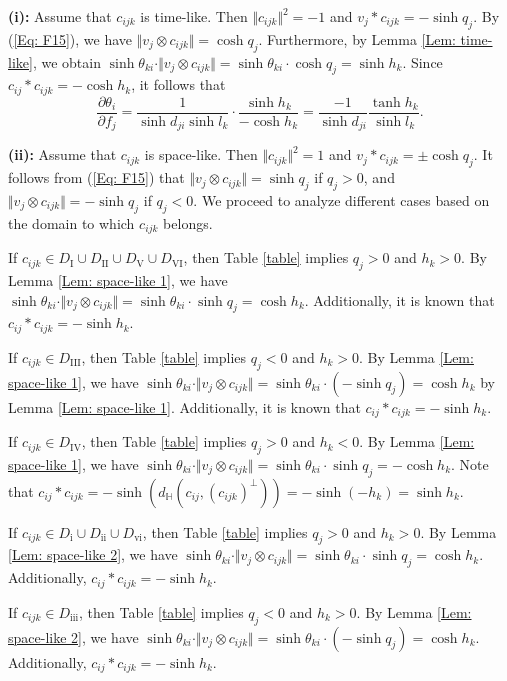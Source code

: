 \documentclass[12pt]{amsart}
\theoremstyle{definition}
\begin{document}
\noindent\textbf{(i):}
Assume that $c_{ijk}$ is time-like.
Then $\Vert c_{ijk}\Vert ^2=-1$ and $v_j*c_{ijk}=-\sinh q_j$.
By (\ref{Eq: F15}), we have
$\Vert v_j\otimes c_{ijk}\Vert =\cosh q_j$.
Furthermore, by Lemma \ref{Lem: time-like}, we obtain
$\sinh \theta_{ki}\cdot \Vert v_j\otimes c_{ijk}\Vert =\sinh \theta_{ki}\cdot\cosh q_j=\sinh h_k$.
Since $c_{ij}\ast c_{ijk}=-\cosh h_k$,
it follows that
\begin{equation*}
\frac{\partial \theta_i}{\partial f_j}
=\frac{1}{\sinh d_{ji}\sinh l_k}\cdot\frac{\sinh h_k}{-\cosh h_k}
=\frac{-1}{\sinh d_{ji}}\frac{\tanh h_k}{\sinh l_k}.
\end{equation*}

\noindent\textbf{(ii):}
Assume that $c_{ijk}$ is space-like.
Then $\Vert c_{ijk}\Vert ^2=1$ and $v_j*c_{ijk}=\pm\cosh q_j$.
It follows from (\ref{Eq: F15}) that
$\Vert v_j\otimes c_{ijk}\Vert =\sinh q_j$ if $q_j>0$, and $\Vert v_j\otimes c_{ijk}\Vert =-\sinh q_j$ if $q_j<0$.
We proceed to analyze different cases based on the domain to which $c_{ijk}$ belongs.

If $c_{ijk}\in D_{\mathrm{I}}\cup D_{\mathrm{II}}\cup D_{\mathrm{V}}\cup D_{\mathrm{VI}}$, then Table \ref{table} implies $q_j>0$ and $h_k>0$.
By Lemma \ref{Lem: space-like 1}, we have $\sinh \theta_{ki}\cdot \Vert v_j\otimes c_{ijk}\Vert =\sinh \theta_{ki}\cdot\sinh q_j=\cosh h_k$.
Additionally, it is known that $c_{ij}\ast c_{ijk}=-\sinh h_k$.

If $c_{ijk}\in D_{\mathrm{III}}$, then Table \ref{table} implies $q_j<0$ and $h_k>0$.
By Lemma \ref{Lem: space-like 1}, we have $\sinh \theta_{ki}\cdot \Vert v_j\otimes c_{ijk}\Vert =\sinh \theta_{ki}\cdot(-\sinh q_j)=\cosh h_k$ by Lemma \ref{Lem: space-like 1}.
Additionally, it is known that $c_{ij}\ast c_{ijk}=-\sinh h_k$.

If $c_{ijk}\in D_{\mathrm{IV}}$, then Table \ref{table} implies $q_j>0$ and $h_k<0$.
By Lemma \ref{Lem: space-like 1}, we have $\sinh \theta_{ki}\cdot \Vert v_j\otimes c_{ijk}\Vert =\sinh \theta_{ki}\cdot\sinh q_j=-\cosh h_k$. 
Note that $c_{ij}\ast c_{ijk}=-\sinh(d_\mathbb{H}(c_{ij},(c_{ijk})^\bot))=-\sinh (-h_k)=\sinh h_k$.

If $c_{ijk}\in D_{\mathrm{i}}\cup D_{\mathrm{ii}}\cup D_{\mathrm{vi}}$, then Table \ref{table} implies $q_j>0$ and $h_k>0$.
By Lemma \ref{Lem: space-like 2}, we have $\sinh \theta_{ki}\cdot \Vert v_j\otimes c_{ijk}\Vert =\sinh \theta_{ki}\cdot\sinh q_j=\cosh h_k$.
Additionally, $c_{ij}\ast c_{ijk}=-\sinh h_k$.

If $c_{ijk}\in D_{\mathrm{iii}}$, then Table \ref{table} implies $q_j<0$ and $h_k>0$.
By Lemma \ref{Lem: space-like 2}, we have $\sinh \theta_{ki}\cdot \Vert v_j\otimes c_{ijk}\Vert =\sinh \theta_{ki}\cdot(-\sinh q_j)=\cosh h_k$.
Additionally, $c_{ij}\ast c_{ijk}=-\sinh h_k$.
\end{document}
